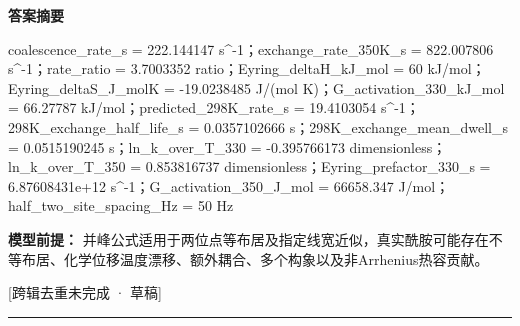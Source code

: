 \documentclass[UTF8,11pt,a4paper]{ctexart}
\begin{document}
\noindent\textbf{答案摘要}\par
coalescence\_rate\_s = 222.144147 s\textasciicircum{}-1；exchange\_rate\_350K\_s = 822.007806 s\textasciicircum{}-1；rate\_ratio = 3.7003352 ratio；Eyring\_deltaH\_kJ\_mol = 60 kJ/mol；Eyring\_deltaS\_J\_molK = -19.0238485 J/(mol K)；G\_activation\_330\_kJ\_mol = 66.27787 kJ/mol；predicted\_298K\_rate\_s = 19.4103054 s\textasciicircum{}-1；298K\_exchange\_half\_life\_s = 0.0357102666 s；298K\_exchange\_mean\_dwell\_s = 0.0515190245 s；ln\_k\_over\_T\_330 = -0.395766173 dimensionless；ln\_k\_over\_T\_350 = 0.853816737 dimensionless；Eyring\_prefactor\_330\_s = 6.87608431e+12 s\textasciicircum{}-1；G\_activation\_350\_J\_mol = 66658.347 J/mol；half\_two\_site\_spacing\_Hz = 50 Hz\par
\noindent\textbf{模型前提：}
并峰公式适用于两位点等布居及指定线宽近似，真实酰胺可能存在不等布居、化学位移温度漂移、额外耦合、多个构象以及非Arrhenius热容贡献。\par
\noindent\textcolor{red!65!black}{[跨辑去重未完成 · 草稿]} \par
\medskip\hrule\medskip
{}
\end{document}
